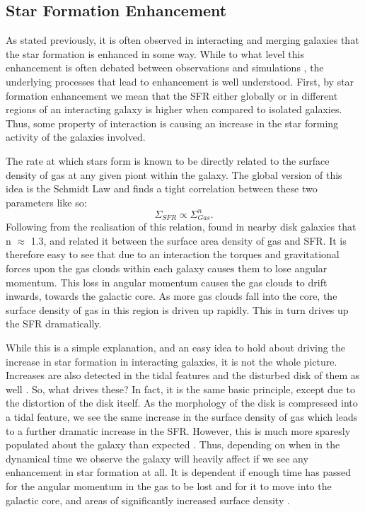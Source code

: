 \subsection{Star Formation Enhancement} 
\noindent As stated previously, it is often observed in interacting and merging galaxies that the star formation is enhanced in some way. While to what level this enhancement is often debated between observations \citep{} and simulations \citep{}, the underlying processes that lead to enhancement is well understood. First, by star formation enhancement we mean that the SFR either globally or in different regions of an interacting galaxy is higher when compared to isolated galaxies. Thus, some property of interaction is causing an increase in the star forming activity of the galaxies involved. 

The rate at which stars form is known to be directly related to the surface density of gas at any given piont within the galaxy. The global version of this idea is the Schmidt Law \citep{1959ApJ...129..243S} and finds a tight correlation between these two parameters like so:
\begin{equation}
	\Sigma_{SFR} \propto \Sigma_{Gas}^{n}. 
\end{equation}
Following from the realisation of this relation, \citet{1989ApJ...344..685K} found in nearby disk galaxies that n $\approx$ 1.3, and related it between the surface area density of gas and SFR. It is therefore easy to see that due to an interaction the torques and gravitational forces upon the gas clouds within each galaxy causes them to lose angular momentum. This loss in angular momentum causes the gas clouds to drift inwards, towards the galactic core. As more gas clouds fall into the core, the surface density of gas in this region is driven up rapidly. This in turn drives up the SFR dramatically.

While this is a simple explanation, and an easy idea to hold about driving the increase in star formation in interacting galaxies, it is not the whole picture. Increases are also detected in the tidal features and the disturbed disk of them as well \citep{Papers on increases in star formation in the galactic disk?}. So, what drives these? In fact, it is the same basic principle, except due to the distortion of the disk itself. As the morphology of the disk is compressed into a tidal feature, we see the same increase in the surface density of gas which leads to a further dramatic increase in the SFR. However, this is much more sparesly populated about the galaxy than expected \citep{What am I even saying here?}. Thus, depending on when in the dynamical time we observe the galaxy will heavily affect if we see any enhancement in star formation at all. It is dependent if enough time has passed for the angular momentum in the gas to be lost and for it to move into the galactic core, and areas of significantly increased surface density \citep{Seriously, am I even making any sense here?}.

